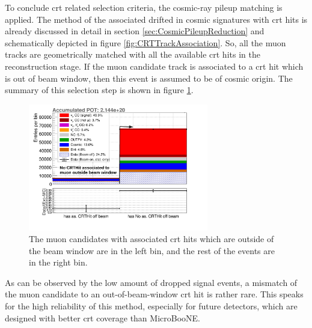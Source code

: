 To conclude \gls{crt} related selection criteria, the cosmic-ray pileup matching is applied. The method of the associated drifted in cosmic signatures with \gls{crt} hits is already discussed in detail in section \ref{sec:CosmicPileupReduction} and schematically depicted in figure \ref{fig:CRTTrackAssociation}. So, all the muon tracks are geometrically matched with all the available \gls{crt} hits in the reconstruction stage. If the muon candidate track is associated to a \gls{crt} hit which is out of beam window, then this event is assumed to be of cosmic origin. The summary of this selection step is shown in figure \ref{fig:no_out_of_time_CRT_4}.
\begin{figure}[htbp]
  \centering
  \includegraphics[width=0.7\textwidth]{images/NewCCInclusive/selection/No_out_of_time_CRT_4.pdf}
  \caption[CRT Hit Association Veto]{The muon candidates with associated \gls{crt} hits which are outside of the beam window are in the left bin, and the rest of the events are in the right bin.}
  \label{fig:no_out_of_time_CRT_4}
\end{figure}
As can be observed by the low amount of dropped signal events, a mismatch of the muon candidate to an out-of-beam-window \gls{crt} hit is rather rare. This speaks for the high reliability of this method, especially for future detectors, which are designed with better \gls{crt} coverage than MicroBooNE.

